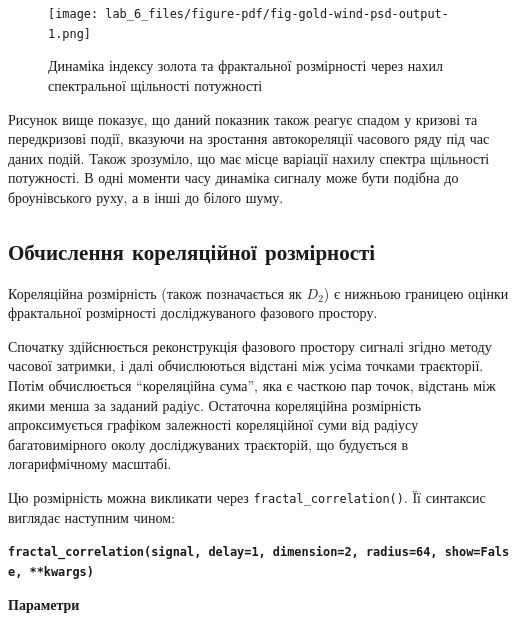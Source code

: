 \documentclass[
  letterpaper,
]{report}
\begin{document}
\begin{figure}[H]

{\centering \texttt{[image: lab\_6\_files/figure-pdf/fig-gold-wind-psd-output-1.png]}

}

\caption{\label{fig-gold-wind-psd}Динаміка індексу золота та фрактальної
розмірності через нахил спектральної щільності потужності}

\end{figure}

Рисунок вище показує, що даний показник також реагує спадом у кризові та
передкризові події, вказуючи на зростання автокореляції часового ряду
під час даних подій. Також зрозуміло, що має місце варіації нахилу
спектра щільності потужності. В одні моменти часу динаміка сигналу може
бути подібна до броунівського руху, а в інші до білого шуму.

\hypertarget{ux43eux431ux447ux438ux441ux43bux435ux43dux43dux44f-ux43aux43eux440ux435ux43bux44fux446ux456ux439ux43dux43eux457-ux440ux43eux437ux43cux456ux440ux43dux43eux441ux442ux456}{%
\subsection{Обчислення кореляційної
розмірності}\label{ux43eux431ux447ux438ux441ux43bux435ux43dux43dux44f-ux43aux43eux440ux435ux43bux44fux446ux456ux439ux43dux43eux457-ux440ux43eux437ux43cux456ux440ux43dux43eux441ux442ux456}}

Кореляційна розмірність (також позначається як \(D_2\)) є нижньою
границею оцінки фрактальної розмірності досліджуваного фазового
простору.

Спочатку здійснюється реконструкція фазового простору сигналі згідно
методу часової затримки, і далі обчислюються відстані між усіма точками
траєкторії. Потім обчислюється ``кореляційна сума'', яка є часткою пар
точок, відстань між якими менша за заданий радіус. Остаточна кореляційна
розмірність апроксимується графіком залежності кореляційної суми від
радіусу багатовимірного околу досліджуваних траєкторій, що будується в
логарифмічному масштабі.

Цю розмірність можна викликати через \texttt{fractal\_correlation()}. Її
синтаксис виглядає наступним чином:

\textbf{\texttt{fractal\_correlation(signal,\ delay=1,\ dimension=2,\ radius=64,\ show=False,\ **kwargs)}}

\textbf{Параметри}
\end{document}
